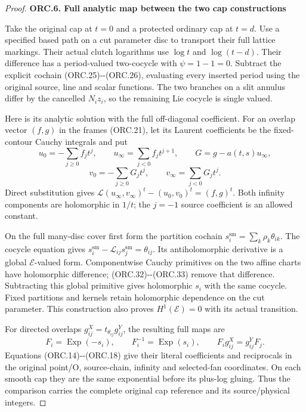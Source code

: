\begin{proof}
\par

\medskip\noindent\textbf{ORC.6. Full analytic map between the two cap constructions}

\par\nobreak

Take the original cap at \(t=0\) and a protected ordinary cap
at \(t=d\). Use a specified based path on a cut parameter
disc to transport their full lattice markings. Their actual
clutch logarithms use \(\log t\) and \(\log(t-d)\).
Their difference has a period-valued two-cocycle with
\(\psi=1-1=0\). Subtract the explicit cochain
(ORC.25)-\/-(ORC.26), evaluating every inserted period using
the original source, line and scalar functions. The two
branches on a slit annulus differ by the cancelled
\(N_iz_i\), so the remaining Lie cocycle is single valued.

Here is its analytic solution with the full off-diagonal
coefficient. For an overlap vector \((f,g)\) in the frames
(ORC.21), let its Laurent coefficients be the fixed-contour
Cauchy integrals and put
\[
u_0=-\sum_{j\geq0}f_jt^j,\qquad
u_\infty=\sum_{j<0}f_jt^{j+1},\qquad
G=g-a(t,s)u_\infty ,
\tag{ORC.32}
\]
\[
v_0=-\sum_{j\geq0}G_jt^j,\qquad
v_\infty=\sum_{j<0}G_jt^j.
\tag{ORC.33}
\]
Direct substitution gives
\(\mathcal L(u_\infty,v_\infty)^t-(u_0,v_0)^t=(f,g)^t\).
Both infinity components are holomorphic in \(1/t\);
the \(j=-1\) source coefficient is an allowed constant.

On the full many-disc cover first form the partition cochain
\(s_i^{\mathrm{sm}}=\sum_k\rho_k\theta_{ik}\).
The cocycle equation gives
\(s_i^{\mathrm{sm}}-\mathcal L_{ij}s_j^{\mathrm{sm}}=\theta_{ij}\).
Its antiholomorphic derivative is a global \(\mathscr E\)-valued
form. Componentwise Cauchy primitives on the two affine
charts have holomorphic difference; (ORC.32)-\/-(ORC.33)
remove that difference. Subtracting this global primitive
gives holomorphic \(s_i\) with the same cocycle.
Fixed partitions and kernels retain holomorphic dependence
on the cut parameter. This construction also proves
\(H^1(\mathscr E)=0\) with its actual transition.

For directed overlaps \(g^X_{ij}=t_{\theta_{ij}}g^Y_{ij}\),
the resulting full maps are
\[
F_i=\operatorname{Exp}(-s_i),\qquad
F_i^{-1}=\operatorname{Exp}(s_i),\qquad
F_i g^X_{ij}=g^Y_{ij}F_j .
\tag{ORC.34}
\]
Equations (ORC.14)-\/-(ORC.18) give their literal coefficients
and reciprocals in the original point/O, source-chain,
infinity and selected-fan coordinates. On each smooth cap
they are the same exponential before its plus-log gluing.
Thus the comparison carries the complete original cap
reference and its source/physical integers.


\end{proof}
